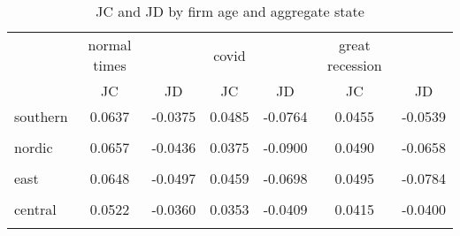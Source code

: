 \begin{table}[htbp]\centering
\caption{JC and JD by firm age and aggregate state}
\begin{tabular}{l*{6}{c}}
\hline\hline
                    &normal times&            &       covid&            &great recession&            \\
                    &\multicolumn{1}{c}{JC}&\multicolumn{1}{c}{JD}&\multicolumn{1}{c}{JC}&\multicolumn{1}{c}{JD}&\multicolumn{1}{c}{JC}&\multicolumn{1}{c}{JD}\\
\hline
southern            &      0.0637&     -0.0375&      0.0485&     -0.0764&      0.0455&     -0.0539\\
                    &            &            &            &            &            &            \\
[1em]
nordic              &      0.0657&     -0.0436&      0.0375&     -0.0900&      0.0490&     -0.0658\\
                    &            &            &            &            &            &            \\
[1em]
east                &      0.0648&     -0.0497&      0.0459&     -0.0698&      0.0495&     -0.0784\\
                    &            &            &            &            &            &            \\
[1em]
central             &      0.0522&     -0.0360&      0.0353&     -0.0409&      0.0415&     -0.0400\\
                    &            &            &            &            &            &            \\
\hline\hline
\end{tabular}
\end{table}
